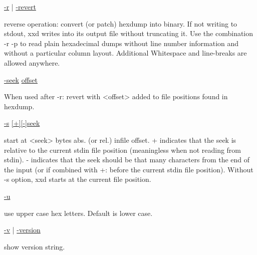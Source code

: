 \documentclass{ctexart}
\begin{document}
\begin{adjustwidth}{1cm}{0cm}
\noindent \underline{-r} | \underline{-revert}
\begin{adjustwidth}{1cm}{0cm}
  reverse operation: convert (or patch) hexdump into binary.  If not writing to
  stdout, xxd writes into its output file without truncating it. Use the
  combination -r  -p  to read plain hexadecimal dumps without line number
  information and without a particular column layout. Additional Whitespace and
  line-breaks are allowed anywhere. \\
\end{adjustwidth}

\noindent \underline{-seek} \underline{offset}
\begin{adjustwidth}{1cm}{0cm}
  When used after -r: revert with <offset> added to file positions found in
  hexdump. \\
\end{adjustwidth}

\noindent \underline{-s} \underline{[+][-]seek}
\begin{adjustwidth}{1cm}{0cm}
  start at <seek> bytes abs. (or rel.) infile offset.  + indicates that the seek
  is relative to the current stdin file position (meaningless when not reading
  from stdin).  - indicates that the seek should be that many characters from
  the end of the input (or if combined with +: before the current stdin file
  position).  Without -s  option,  xxd starts at the current file position. \\
\end{adjustwidth}

\noindent \underline{-u}
\begin{adjustwidth}{1cm}{0cm}
  use upper case hex letters. Default is lower case. \\
\end{adjustwidth}

\noindent \underline{-v} | \underline{-version}
\begin{adjustwidth}{1cm}{0cm}
  show version string. \\
\end{adjustwidth}
\end{adjustwidth}
\end{document}
